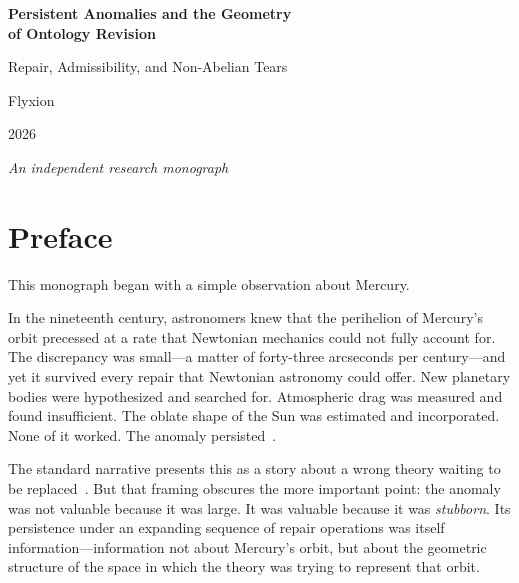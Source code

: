 \documentclass[12pt,oneside]{book}
\theoremstyle{plain}
\theoremstyle{definition}
\theoremstyle{remark}
\newcommand{\1}{\mathbf{1}}
\begin{document}

\begin{titlepage}
\centering
\vspace*{2cm}
{\Large\bfseries Persistent Anomalies and the Geometry\\[6pt] of Ontology Revision\par}
\vspace{1cm}
{\large Repair, Admissibility, and Non-Abelian Tears\par}
\vspace{2cm}
{\normalsize Flyxion\par}
\vspace{1cm}
{\normalsize 2026\par}
\vfill
{\small\itshape An independent research monograph\par}
\end{titlepage}

\frontmatter
\tableofcontents

\chapter*{Preface}

This monograph began with a simple observation about Mercury.

In the nineteenth century, astronomers knew that the perihelion of Mercury's orbit precessed at a rate that Newtonian mechanics could not fully account for. The discrepancy was small---a matter of forty-three arcseconds per century---and yet it survived every repair that Newtonian astronomy could offer. New planetary bodies were hypothesized and searched for. Atmospheric drag was measured and found insufficient. The oblate shape of the Sun was estimated and incorporated. None of it worked. The anomaly persisted~\cite{will2014,einstein1916}.

The standard narrative presents this as a story about a wrong theory waiting to be replaced~\cite{kuhn1962,lakatos1978}. But that framing obscures the more important point: the anomaly was not valuable because it was large. It was valuable because it was \emph{stubborn}. Its persistence under an expanding sequence of repair operations was itself information---information not about Mercury's orbit, but about the geometric structure of the space in which the theory was trying to represent that orbit.
\end{document}
